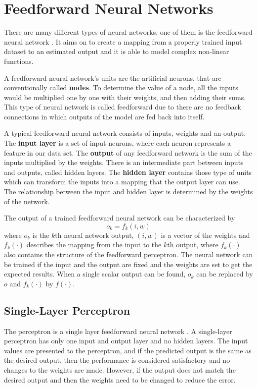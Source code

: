 \section{Feedforward Neural Networks}

There are many different types of neural networks, one of them is the feedforward neural network \cite{fine2006feedforward}. It aims on to create a mapping from a properly trained input dataset to an estimated output and it is able to model complex non-linear functions. \medskip

A feedforward neural network's units are the artificial neurons, that are conventionally called \textbf{nodes}. To determine the value of a node, all the inputs would be multiplied one by one with their weights, and then adding their sums. This type of neural network is called feedforward due to there are no feedback connections in which outputs of the model are fed back into itself. \medskip

A typical feedforward neural network consists of inputs, weights and an output. The \textbf{input layer} is a set of input neurons, where each neuron represents a feature in our data set. The \textbf{output} of any feedforward network is the sum of the inputs multiplied by the weights. There is an intermediate part between inputs and outputs, called hidden layers. The \textbf{hidden layer} contains those type of units which can transform the inputs into a mapping that the output layer can use. The relationship between the input and hidden layer is determined by the weights of the network. \medskip

\noindent The output of a trained feedforward neural network can be characterized by
$$ o_k = f_k(i,w) $$
where $o_k$ is the $k$th neural network output, $(i,w)$ is a vector of the weights and $f_k(\cdot)$ describes the mapping from the input to the $k$th output, where $f_k(\cdot)$ also contains the structure of the feedforward perceptron. The neural network can be trained if the input and the output are fixed and the weights are set to get the expected results. When a single scalar output can be found, $o_k$ can be replaced by $o$ and $f_k(\cdot)$ by $f(\cdot)$.



\subsection{Single-Layer Perceptron}

The perceptron is a single layer feedforward neural network \cite{tho2010perceptron}. A single-layer perceptron has only one input and output layer and no hidden layers. The input values are presented to the perceptron, and if the predicted output is the same as the desired output, then the performance is considered satisfactory and no changes to the weights are made. However, if the output does not match the desired output and then the weights need to be changed to reduce the error. \medskip

